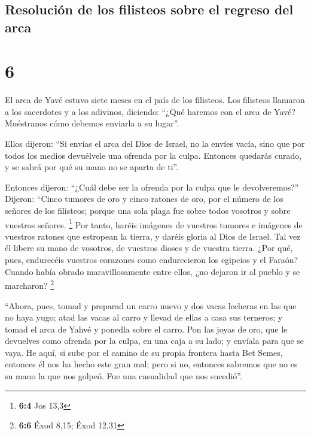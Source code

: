 \begin{paracol}{2}
{\subsection{Resolución de los filisteos sobre el regreso del
arca}\label{resoluciuxf3n-de-los-filisteos-sobre-el-regreso-del-arca}}

\hypertarget{section-10}{%
\section{6}\label{section-10}}

 El arca de Yavé estuvo siete meses en el país de los
filisteos.  Los filisteos llamaron a los sacerdotes y a
los adivinos, diciendo: ``¿Qué haremos con el arca de Yavé? Muéstranos
cómo debemos enviarla a su lugar''.

 Ellos dijeron: ``Si envías el arca del Dios de Israel, no
la envíes vacía, sino que por todos los medios devuélvele una ofrenda
por la culpa. Entonces quedarás curado, y se sabrá por qué su mano no se
aparta de ti''.

 Entonces dijeron: ``¿Cuál debe ser la ofrenda por la
culpa que le devolveremos?'' Dijeron: ``Cinco tumores de oro y cinco
ratones de oro, por el número de los señores de los filisteos; porque
una sola plaga fue sobre todos vosotros y sobre vuestros señores.
\footnote{\textbf{6:4} Jos 13,3}  Por tanto, haréis
imágenes de vuestros tumores e imágenes de vuestros ratones que
estropean la tierra, y daréis gloria al Dios de Israel. Tal vez él
libere su mano de vosotros, de vuestros dioses y de vuestra tierra.
 ¿Por qué, pues, endurecéis vuestros corazones como
endurecieron los egipcios y el Faraón? Cuando había obrado
maravillosamente entre ellos, ¿no dejaron ir al pueblo y se marcharon?
\footnote{\textbf{6:6} Éxod 8,15; Éxod 12,31}

 ``Ahora, pues, tomad y preparad un carro nuevo y dos
vacas lecheras en las que no haya yugo; atad las vacas al carro y llevad
de ellas a casa sus terneros;  y tomad el arca de Yahvé y
ponedla sobre el carro. Pon las joyas de oro, que le devuelves como
ofrenda por la culpa, en una caja a su lado; y envíala para que se vaya.
 He aquí, si sube por el camino de su propia frontera
hasta Bet Semes, entonces él nos ha hecho este gran mal; pero si no,
entonces sabremos que no es su mano la que nos golpeó. Fue una
casualidad que nos sucedió''.

\hypertarget{ejecuciuxf3n-de-la-resoluciuxf3n-llegada-y-recepciuxf3n-del-arca-en-bet-semes}{%
}
\end{paracol}
